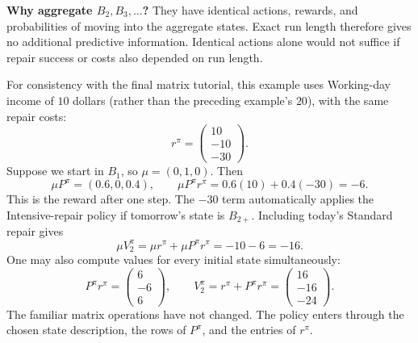 \documentclass[11pt]{article}
\theoremstyle{remark}\newtheorem{remark}[definition]{Remark}
\begin{document}
\textbf{Why aggregate $B_2,B_3,\ldots$?} They have identical actions, rewards, and probabilities of moving into the aggregate states. Exact run length therefore gives no additional predictive information. Identical actions alone would not suffice if repair success or costs also depended on run length.

For consistency with the final matrix tutorial, this example uses Working-day income of $10$ dollars (rather than the preceding example's $20$), with the same repair costs:
\[
r^\pi=\begin{pmatrix}10\\-10\\-30\end{pmatrix}.
\]
Suppose we start in $B_1$, so $\mu=(0,1,0)$. Then
\[
\mu P^\pi=(0.6,0,0.4),\qquad
\mu P^\pi r^\pi=0.6(10)+0.4(-30)=-6.
\]
This is the reward after one step. The $-30$ term automatically applies the Intensive-repair policy if tomorrow's state is $B_{2+}$. Including today's Standard repair gives
\[
\boxed{\mu V_2^\pi=\mu r^\pi+\mu P^\pi r^\pi=-10-6=-16.}
\]
One may also compute values for every initial state simultaneously:
\[
P^\pi r^\pi=\begin{pmatrix}6\\-6\\6\end{pmatrix},\qquad
V_2^\pi=r^\pi+P^\pi r^\pi=\begin{pmatrix}16\\-16\\-24\end{pmatrix}.
\]
The familiar matrix operations have not changed. The policy enters through the chosen state description, the rows of $P^\pi$, and the entries of $r^\pi$.

\clearpage
\end{document}
